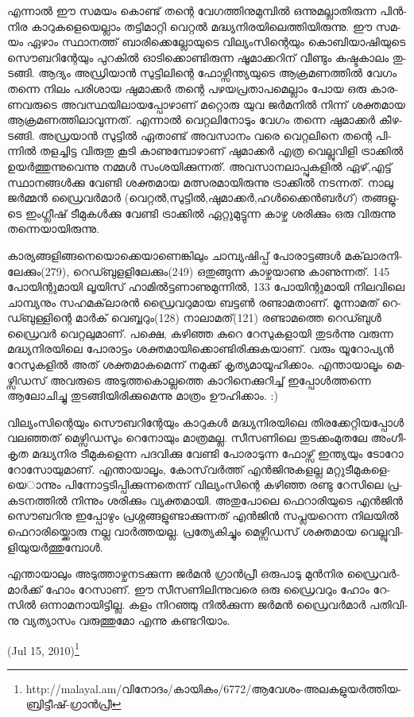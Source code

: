 എ­ന്നാല്‍ ഈ സമ­യം കൊ­ണ്ട് തന്റെ വേ­ഗ­ത്തി­നു­മു­മ്പില്‍ ഒന്നു­മ­ല്ലാ­തി­രു­ന്ന പിന്‍­നിര കാ­റു­ക­ളെ­യെ­ല്ലാം തട്ടി­മാ­റ്റി വെ­റ്റല്‍ 
മദ്ധ്യ­നി­ര­യി­ലെ­ത്തി­യി­രു­ന്നു. ഈ സമ­യം ഏഴാം സ്ഥാ­ന­ത്ത് ബാ­രി­ക്കെ­ല്ലോ­യു­ടെ വി­ല്യം­സി­ന്റെ­യും കൊ­ബി­യാ­ഷി­യു­ടെ സൌ­ബ­റി­ന്റേ­യും 
പു­റ­കില്‍ ഓടി­ക്കൊ­ണ്ടി­രു­ന്ന ഷൂ­മാ­ക്ക­റി­ന് വീ­ണ്ടും കഷ്ട­കാ­ലം തു­ട­ങ്ങി. ആദ്യം അഡ്രി­യാന്‍ സു­ട്ടി­ലി­ന്റെ ഫോ­ഴ്സി­ന്ത്യ­യു­ടെ ആക്ര­മ­ണ­ത്തില്‍ 
വേ­ഗം തന്നെ നി­ലം പരി­ശായ ഷു­മാ­ക്കര്‍ തന്റെ പഴ­യ­പ്ര­താ­പ­മെ­ല്ലാം പോയ ഒരു കാ­ര­ണ­വ­രു­ടെ അവ­സ്ഥ­യി­ലാ­യ­പ്പോ­ഴാ­ണ് മറ്റൊ­രു
 യുവ ജര്‍­മ­നില്‍ നി­ന്ന് ശക്ത­മായ ആക്ര­മ­ണ­ത്തി­ലാ­വു­ന്ന­ത്. എന്നാല്‍ വെ­റ്റ­ലി­നോ­ടും വേ­ഗം തന്നെ ഷു­മാ­ക്കര്‍ കീ­ഴ­ട­ങ്ങി. അഡ്ര­യാന്‍ 
 സു­ട്ടില്‍ ഏതാ­ണ്ട് അവ­സാ­നം വരെ വെ­റ്റ­ലി­നെ തന്റെ പി­ന്നില്‍ തള­ച്ചി­ട്ട വി­രു­തു കൂ­ടി കാ­ണു­മ്പോ­ഴാ­ണ് ഷു­മാ­ക്കര്‍ എത്ര വെ­ല്ലു­വി­ളി 
 ട്രാ­ക്കില്‍ ഉയര്‍­ത്തു­ന്നു­വെ­ന്നു നമ്മള്‍ സം­ശ­യി­ക്കു­ന്ന­ത്. അവ­സാ­ന­ലാ­പ്പു­ക­ളില്‍ ഏഴ്,എ­ട്ട് സ്ഥാ­ന­ങ്ങള്‍­ക്കു വേ­ണ്ടി ശക്ത­മായ 
 മത്സ­ര­മാ­യി­രു­ന്നു ട്രാ­ക്കില്‍ നട­ന്ന­ത്. നാ­ലു ജര്‍­മ്മന്‍ ഡ്രൈ­വര്‍­മാര്‍ (വെ­റ്റല്‍,­സു­ട്ടില്‍,­ഷു­മാ­ക്കര്‍,­ഹള്‍­ക്കൈന്‍­ബര്‍­ഗ്) തങ്ങ­ളു­ടെ ഇം­ഗ്ലീ­ഷ് 
 ടീ­മു­കള്‍­ക്കു വേ­ണ്ടി ട്രാ­ക്കില്‍ ഏറ്റു­മു­ട്ടു­ന്ന കാ­ഴ്ച ശരി­ക്കും ഒരു വി­രു­ന്നു തന്നെ­യാ­യി­രു­ന്നു­.

­കാ­ര്യ­ങ്ങ­ളി­ങ്ങ­നെ­യൊ­ക്കെ­യാ­ണെ­ങ്കി­ലും ചാ­മ്പ്യ­ഷി­പ്പ് പോ­രാ­ട്ട­ങ്ങള്‍ മക്‌­ലാ­ര­നി­ലേ­ക്കും­(279), റെ­ഡ്ബു­ള­ളി­ലേ­ക്കും­(249) ഒതു­ങ്ങു­ന്ന 
കാ­ഴ്ച­യാ­ണു കാ­ണു­ന്ന­ത്. 145 പോ­യി­ന്റു­മാ­യി ലൂ­യി­സ് ഹാ­മില്‍­ട്ട­ണാ­ണു­മു­ന്നില്‍, 133 പോ­യി­ന്റു­മാ­യി നി­ല­വി­ലെ ചാ­മ്പ്യ­നും സഹ­മ­ക്‌­ലാ­രന്‍ 
ഡ്രൈ­വ­റു­മായ ബട്ടണ്‍ രണ്ടാ­മ­താ­ണ്. മൂ­ന്നാ­മ­ത് റെ­ഡ്ബു­ള്ളി­ന്റെ മാര്‍­ക് വെ­ബ്ബ­റും­(128) നാ­ലാ­മ­ത്(121) രണ്ടാ­മ­ത്തെ റെ­ഡ്ബുള്‍ 
ഡ്രൈ­വര്‍ വെ­റ്റ­ലു­മാ­ണ്. പക്ഷെ, കഴി­ഞ്ഞ കു­റെ റേ­സു­ക­ളാ­യി തു­ടര്‍­ന്നു വരു­ന്ന മദ്ധ്യ­നി­ര­യി­ലെ പോ­രാ­ട്ടം ശക്ത­മാ­യി­ക്കൊ­ണ്ടി­രി­ക്കു­ക­യാ­ണ്.
 വരും യൂ­റോ­പ്യന്‍ റേ­സു­ക­ളില്‍ അത് ശക്ത­മാ­കു­മെ­ന്ന് നമു­ക്ക് കൃ­ത്യ­മാ­യൂ­ഹി­ക്കാം. എന്താ­യാ­ലൂം ­മെ­ഴ്സി­ഡ­സ് അവ­രു­ടെ 
 അടു­ത്ത­കൊ­ല്ല­ത്തെ കാ­റി­നെ­ക്കു­റി­ച്ച് ഇപ്പോള്‍­ത്ത­ന്നെ ആലോ­ചി­ച്ചു തു­ട­ങ്ങി­യി­രി­ക്കു­മെ­ന്നു മാ­ത്രം ഊഹി­ക്കാം. :)

­വി­ല്യം­സി­ന്റെ­യും സൌ­ബ­റി­ന്റേ­യും കാ­റു­കള്‍ മദ്ധ്യ­നി­ര­യി­ലെ തി­ര­ക്കേ­റ്റി­യ­പ്പോള്‍ വല­ഞ്ഞ­ത് മെ­ഴ്സി­ഡ­സും റെ­നോ­യും മാ­ത്ര­മ­ല്ല. 
സീ­സ­ണി­ലെ തു­ട­ക്കം­മു­ത­ലേ അം­ഗീ­കൃത മദ്ധ്യ­നിര ടീ­മു­ക­ളെ­ന്ന പദ­വി­ക്കു വേ­ണ്ടി പോ­രാ­ടു­ന്ന ഫോ­ഴ്സ് ഇന്ത്യ­യും ടോ­റോ റോ­സോ­യു­മാ­ണ്. 
എന്താ­യാ­ലൂം, കോ­സ്‌­വര്‍­ത്ത് എന്‍­ജി­നു­ക­ള­ല്ല മറ്റു­ടീ­മു­ക­ളെ­യെ­ാ­ന്നും പി­ന്നോ­ട്ട­ടി­പ്പി­ക്കു­ന്ന­തെ­ന്ന് വി­ല്യം­സി­ന്റെ കഴി­ഞ്ഞ രണ്ടു റേ­സി­ലെ 
പ്ര­ക­ട­ന­ത്തില്‍ നി­ന്നും ശരി­ക്കും വ്യ­ക്ത­മാ­യി. അതു­പോ­ലെ ഫെ­റാ­രി­യു­ടെ എന്‍­ജിന്‍ സൌ­ബ­റി­നു ഇപ്പോ­ഴും പ്ര­ശ്ന­ങ്ങ­ളു­ണ്ടാ­ക്കു­ന്ന­ത് 
എന്‍­ജിന്‍ സപ്ല­യ­റെ­ന്ന നി­ല­യില്‍ ഫെ­റാ­രി­യ്ക്കൊ­രു നല്ല വാര്‍­ത്ത­യ­ല്ല. പ്ര­ത്യേ­കി­ച്ചും മെ­ഴ്സി­ഡ­സ് ശക്ത­മായ വെ­ല്ലു­വി­ളി­യു­യര്‍­ത്തു­മ്പോള്‍.

എ­ന്താ­യാ­ലും അടു­ത്താ­ഴ്ച­ന­ട­ക്കു­ന്ന ജര്‍­മന്‍ ഗ്രാന്‍­പ്രീ ഒരു­പാ­ടു മുന്‍­നിര ഡ്രൈ­വര്‍­മാര്‍­ക്ക് ഹോം റേ­സാ­ണ്. ഈ സീ­സ­ണി­ലി­ന്നു­വ­രെ 
ഒരു ഡ്രൈ­വ­റും ഹോം റേ­സില്‍ ഒന്നാ­മ­നാ­യി­ട്ടി­ല്ല. കളം നി­റ­ഞ്ഞു നില്‍­ക്കു­ന്ന ജര്‍­മന്‍ ഡ്രൈ­വര്‍­മാര്‍ പതി­വി­നു വ്യ­ത്യാ­സം വരു­ത്തു­മോ 
എന്നു കണ്ട­റി­യാം­.

(Jul 15, 2010)\footnote{http://malayal.am/വിനോദം/കായികം/6772/ആവേശം-അലകളുയര്‍ത്തിയ-ബ്രിട്ടീഷ്-ഗ്രാന്‍പ്രീ}
\newpage
